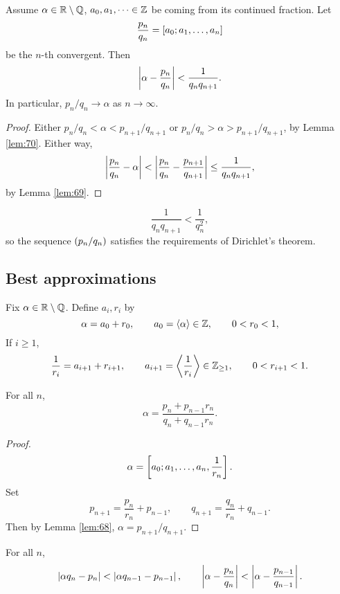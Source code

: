 \begin{corollary}
Assume $ \alpha \in \R \setminus \Q $, $ a_0, a_1, \dots \in \Z $ be coming from its continued fraction. Let
$$ \dfrac{p_n}{q_n} = \sb{a_0; a_1, \dots, a_n} $$
be the $ n $-th convergent. Then
$$ \abs{\alpha - \dfrac{p_n}{q_n}} < \dfrac{1}{q_nq_{n + 1}}. $$
In particular, $ p_n / q_n \to \alpha $ as $ n \to \infty $.
\end{corollary}

\begin{proof}
Either $ p_n / q_n < \alpha < p_{n + 1} / q_{n + 1} $ or $ p_n / q_n > \alpha > p_{n + 1} / q_{n + 1} $, by Lemma \ref{lem:70}. Either way,
$$ \abs{\dfrac{p_n}{q_n} - \alpha} < \abs{\dfrac{p_n}{q_n} - \dfrac{p_{n + 1}}{q_{n + 1}}} \le \dfrac{1}{q_nq_{n + 1}}, $$
by Lemma \ref{lem:69}.
\end{proof}

\begin{note}
$$ \dfrac{1}{q_nq_{n + 1}} < \dfrac{1}{q_n^2}, $$
so the sequence $ \rb{p_n / q_n} $ satisfies the requirements of Dirichlet's theorem.
\end{note}

\subsection{Best approximations}

Fix $ \alpha \in \R \setminus \Q $. Define $ a_i, r_i $ by
$$ \alpha = a_0 + r_0, \qquad a_0 = \fb{\alpha} \in \Z, \qquad 0 < r_0 < 1, $$
If $ i \ge 1 $,
$$ \dfrac{1}{r_i} = a_{i + 1} + r_{i + 1}, \qquad a_{i + 1} = \fb{\dfrac{1}{r_i}} \in \Z_{\ge 1}, \qquad 0 < r_{i + 1} < 1. $$

\begin{lemma}
\label{lem:72}
For all $ n $,
$$ \alpha = \dfrac{p_n + p_{n - 1}r_n}{q_n + q_{n - 1}r_n}. $$
\end{lemma}

\begin{proof}
$$ \alpha = \sb{a_0; a_1, \dots, a_n, \dfrac{1}{r_n}}. $$
Set
$$ p_{n + 1} = \dfrac{p_n}{r_n} + p_{n - 1}, \qquad q_{n + 1} = \dfrac{q_n}{r_n} + q_{n - 1}. $$
Then by Lemma \ref{lem:68}, $ \alpha = p_{n + 1} / q_{n + 1} $.
\end{proof}

\begin{corollary}
For all $ n $,
$$ \abs{\alpha q_n - p_n} < \abs{\alpha q_{n - 1} - p_{n - 1}}, \qquad \abs{\alpha - \dfrac{p_n}{q_n}} < \abs{\alpha - \dfrac{p_{n - 1}}{q_{n - 1}}}. $$
\end{corollary}

